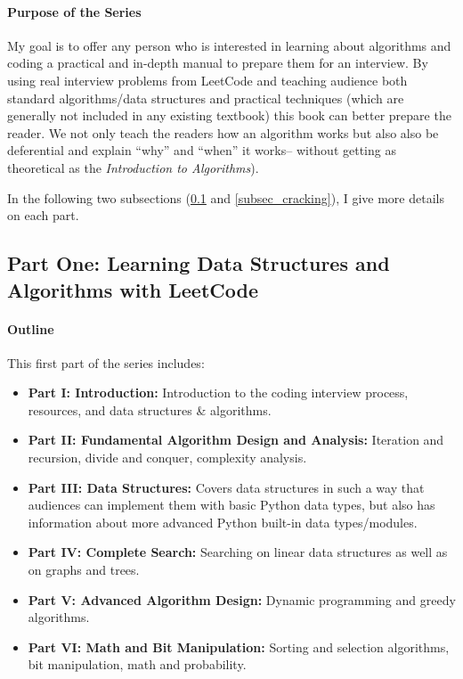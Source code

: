 \documentclass[12pt]{article}
\begin{document}
\paragraph{Purpose of the Series} My goal is to offer any person who is interested in learning about algorithms and coding a practical and in-depth manual to prepare them for an interview. By using real interview problems from LeetCode and teaching audience both standard algorithms/data structures and practical techniques (which are generally not included in any existing textbook)  this book can better prepare the reader. We not only teach the readers how an algorithm works but also also be deferential and explain ``why'' and ``when'' it works-- without getting as theoretical as the \textit{Introduction to Algorithms}).

In the following two subsections (\ref{subsec_learning} and \ref{subsec_cracking}), I give more details on each part. 
\subsection{Part One: Learning Data Structures and Algorithms with LeetCode }
\label{subsec_learning}
\paragraph{Outline} This first part of the series includes:
\begin{itemize}
    \item \textbf{Part \RN{1}: Introduction:} Introduction to the coding interview process, resources, and data structures \& algorithms.
    \item \textbf{Part \RN{2}: Fundamental Algorithm Design and Analysis:} Iteration and recursion, divide and conquer, complexity analysis.
    \item \textbf{Part \RN{3}: Data Structures:} Covers data structures in such a way that audiences can implement them with basic Python data types, but also has information about more advanced Python built-in data types/modules.
    \item \textbf{Part \RN{4}: Complete Search:} Searching on linear data structures as well as on graphs and trees.
    \item \textbf{Part \RN{5}: Advanced Algorithm Design:} Dynamic programming and greedy algorithms.
    \item \textbf{Part \RN{6}: Math and Bit Manipulation:} Sorting and selection algorithms, bit manipulation, math and probability.
\end{itemize}
\end{document}
